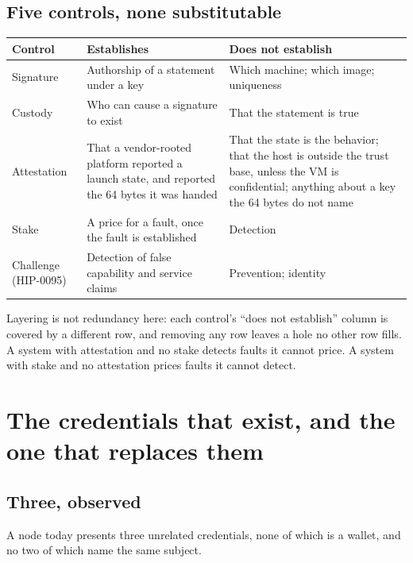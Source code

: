 \documentclass[11pt,a4paper]{article}
\begin{document}
\subsection{Five controls, none substitutable}

\begin{center}
\small
\begin{tabular}{@{}>{\raggedright\arraybackslash}p{}>{\raggedright\arraybackslash}p{}>{\raggedright\arraybackslash}p{}@{}}
\toprule
\textbf{Control} & \textbf{Establishes} & \textbf{Does not establish} \\
\midrule
Signature &
Authorship of a statement under a key &
Which machine; which image; uniqueness \\[3pt]
Custody &
Who can cause a signature to exist &
That the statement is true \\[3pt]
Attestation &
That a vendor-rooted platform reported a launch state, and reported the 64 bytes it was handed &
That the state is the behavior; that the host is outside the trust base, unless the VM is confidential; anything about a key the 64 bytes do not name \\[3pt]
Stake &
A price for a fault, once the fault is established &
Detection \\[3pt]
Challenge (HIP-0095) &
Detection of false capability and service claims &
Prevention; identity \\
\bottomrule
\end{tabular}
\end{center}

Layering is not redundancy here: each control's ``does not establish'' column is
covered by a different row, and removing any row leaves a hole no other row fills.
A system with attestation and no stake detects faults it cannot price. A system
with stake and no attestation prices faults it cannot detect.

\section{The credentials that exist, and the one that replaces them}
\label{sec:three}

\subsection{Three, observed}

A node today presents three unrelated credentials, none of which is a wallet, and
no two of which name the same subject.
\end{document}
